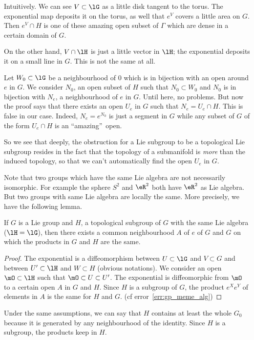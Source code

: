 \begin{theorem}
Intuitively. We can see $V\subset\lG$ as a little disk tangent to  the torus. The exponential map deposits it on the torus, as well that $e^V$ covers a little area on $G$. Then $e^V\cap H$ is one of these amazing open subset of $\Gamma$ which are dense in a certain domain of $G$.

On the other hand, $V\cap\lH$ is just a little vector in $\lH$; the exponential deposits it on a small line in $G$. This is not the same at all.

Let $W_0\subset\lG$  be a neighbourhood of $0$ which is in bijection with an open around $e$ in $G$. We consider $N_0$, an open subset of $H$ such that $N_0\subset W_0$ and $N_0$ is in bijection with $N_e$, a neighbourhood of $e$ in $G$. Until here, no problems. But now the proof says that there exists an open $U_e$ in $G$ such that $N_e=U_e\cap H$. This is false in our case. Indeed, $N_e=e^{N_0}$ is just a segment in $G$ while any subset of $G$ of the form $U_e\cap H$ is an ``amazing''\ open.

So we see that deeply, the obstruction for a Lie subgroup to be a topological Lie subgroup resides in the fact that the topology of a submanifold is \emph{more} than the induced topology, so that we can't automatically find the open $U_e$ in $G$.


Note that two groups which have the same Lie algebra are not necessarily isomorphic. For example the sphere $S^2$ and $\eR^2$ both have $\eR^2$ as Lie algebra. But two groups with same Lie algebra are locally the same. More precisely, we have the following lemma.

\begin{lemma}
	If $G$ is a Lie group and $H$, a topological subgroup of $G$ with the same Lie algebra ($\lH=\lG$), then there exists a common neighbourhood $A$ of $e$ of $G$ and $G$ on which the products in $G$ and $H$ are the same.
\end{lemma}

\begin{proof}
	The exponential is a diffeomorphism between $U\subset\lG$ and $V\subset G$ and between $U'\subset\lH$ and $W\subset H$ (obvious notations). We consider an open $\mO\subset\lH$ such that $\mO\subset U\subset U'$. The exponential is diffeomorphic from $\mO$ to a certain open $A$ in $G$ and $H$. Since $H$ is a subgroup of $G$, the product $e^Xe^Y$ of elements in $A$ is the same for $H$ and $G$. (cf error~\ref{err:gp_meme_alg})
\end{proof}

Under the same assumptions, we can say that $H$ contains at least the whole $G_0$ because it is generated by any neighbourhood of the identity. Since $H$ is a subgroup, the products keep in $H$.


\end{theorem}
